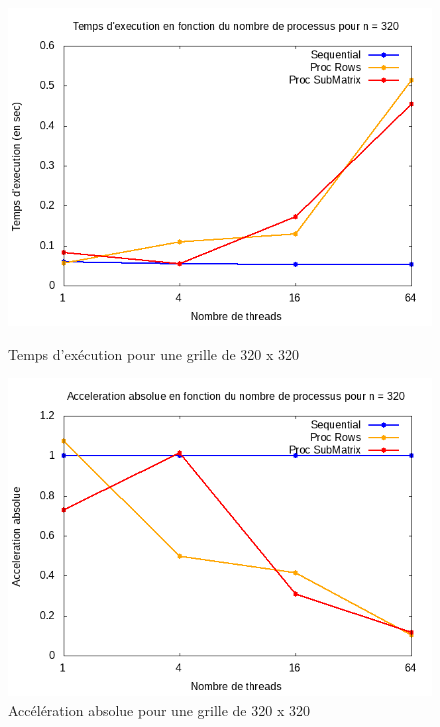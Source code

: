 \documentclass[10pt,a4paper]{article}
\begin{document}
\begin{figure}[h]
  \centering
  \begin{minipage}[b]{0.49\textwidth}
	\includegraphics[width=\textwidth]{./Time/size_320_time.png}
    \caption{Temps d'exécution pour une grille de 320 x 320}
  \end{minipage}
  \hfill
  \begin{minipage}[b]{0.49\textwidth}
    \includegraphics[width=\textwidth]{./Time/size_320_acceleration.png}
    \caption{Accélération absolue pour une grille de 320 x 320}
  \end{minipage}
\end{figure}
\end{document}
